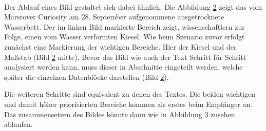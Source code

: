 \begin{figure}[H]
	\centering
	\hfill
	\\
	\label{fig:marsWaterResidue}
\end{figure}

Der Ablauf eines Bild gestaltet sich dabei ähnlich. Die Abbildung
\ref{fig:marsWaterResidue} zeigt das vom Marsrover \glqq Curiosity \grqq
am $28.$ September aufgenommene ausgetrocknete Wasserbett. Der im linken Bild
markierte Bereich zeigt, wissenschaftlern zur Folge, einen vom Wasser verformten
Kiesel. Wie beim Szenario zuvor erfolgt zunächst eine Markierung der wichtigen
Bereiche. Hier der Kiesel und der Maßstab (Bild \ref{fig:marsWaterResidue}
mitte). Bevor das Bild wie auch der Text Schritt für Schritt analysiert werden
kann, muss dieser in Abschnitte eingeteilt werden, welche später die einzelnen
Datenblöcke darstellen (Bild \ref{fig:marsWaterResidue}).
 
\begin{figure}[H]
	\centering
	\hfill
	\hfill
	\label{fig:marsWaterResidue}
\end{figure}

Die weiteren Schritte sind equivalent zu denen des Textes. Die beiden wichtigen
und damit höher priorisierten Bereiche kommen als erstes beim Empfänger an. Das
zusammensetzen des Bildes könnte dann wie in Abbildung
\ref{fig:marsWaterResidueEmpfaenger} zusehen ablaufen.

\begin{figure}[H]
	\centering
	\hfill
	\hfill
	\label{fig:marsWaterResidueEmpfaenger}
\end{figure}